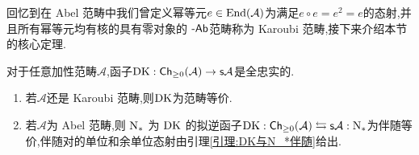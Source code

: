 回忆到在 Abel 范畴中我们曾定义幂等元$e\in \operatorname{End}(\mathcal{A})$为满足$e\circ e = e^2 = e$的态射,并且所有幂等元均有核的具有零对象的 $\text{-}\mathsf{Ab}$范畴称为 Karoubi 范畴,接下来介绍本节的核心定理.
\begin{theorem}
    对于任意加性范畴$\mathcal{A}$,函子$\operatorname{DK} : \mathsf{Ch}_{\geq 0}(\mathcal{A}) \to \mathsf{s} \mathcal{A}$是全忠实的.
    \begin{enumerate}
        \item 若$\mathcal{A}$还是 Karoubi 范畴,则$\operatorname{DK}$为范畴等价.
        \item 若$\mathcal{A}$为 Abel 范畴,则 $\operatorname{N}_*$ 为 $\operatorname{DK}$ 的拟逆函子$\operatorname{DK} : \mathsf{Ch}_{\geq 0}(\mathcal{A}) \leftrightarrows \mathsf{s} \mathcal{A} : \operatorname{N}_*$为伴随等价,伴随对的单位和余单位态射由引理\ref{引理:DK与N_*伴随}给出.
    \end{enumerate}
\end{theorem}

